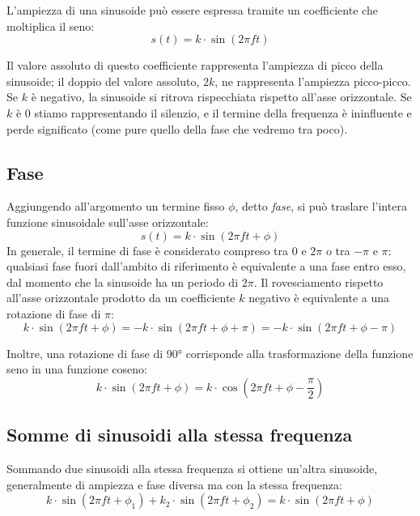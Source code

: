 \documentclass[11pt]{report}
\begin{document}
L'ampiezza di una sinusoide può essere espressa tramite un coefficiente che moltiplica il seno:
\begin{equation}
s(t) = k \cdot \sin(2 \pi f t)
\end{equation}

Il valore assoluto di questo coefficiente rappresenta l'ampiezza di picco della sinusoide; il doppio del valore assoluto, $2k$, ne rappresenta l'ampiezza picco-picco. Se $k$ è negativo, la sinusoide si ritrova rispecchiata rispetto all'asse orizzontale. Se $k$ è 0 stiamo rappresentando il silenzio, e il termine della frequenza è ininfluente e perde significato (come pure quello della fase che vedremo tra poco).


\subsection{Fase}

Aggiungendo all'argomento un termine fisso $\phi$, detto \emph{fase}, si può traslare l'intera funzione sinusoidale sull'asse orizzontale:
\begin{equation}
s(t) = k \cdot \sin(2 \pi f t + \phi)
\end{equation}
In generale, il termine di fase è considerato compreso tra 0 e $2 \pi$ o tra $-\pi$ e $\pi$: qualsiasi fase fuori dall'ambito di riferimento è equivalente a una fase entro esso, dal momento che la sinusoide ha un periodo di $2 \pi$. Il rovesciamento rispetto all'asse orizzontale prodotto da un coefficiente $k$ negativo è equivalente a una rotazione di fase di $\pi$:
\begin{equation}
k \cdot \sin(2 \pi f t + \phi) = -k \cdot \sin(2 \pi f t + \phi + \pi) = -k \cdot \sin(2 \pi f t + \phi - \pi)
\end{equation}

Inoltre, una rotazione di fase di 90° corrisponde alla trasformazione della funzione seno in una funzione coseno:
\begin{equation}
k \cdot \sin(2 \pi f t + \phi) = k \cdot \cos(2 \pi f t + \phi - \frac{\pi}{2})
\end{equation}


\subsection{Somme di sinusoidi alla stessa frequenza}

Sommando due sinusoidi alla stessa frequenza si ottiene un'altra sinusoide, generalmente di ampiezza e fase diversa ma con la stessa frequenza:
\begin{equation}
k \cdot \sin(2 \pi f t + \phi_1) +  k_2 \cdot \sin(2 \pi f t + \phi_2) = k \cdot \sin(2 \pi f t + \phi)
\end{equation}
\end{document}
